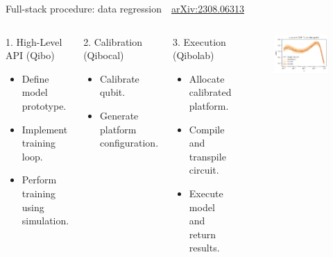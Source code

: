 \documentclass[aspectratio=169, 8pt, xcolor={svgnames}, hyperref={linkcolor=black}]{beamer}
\begin{document}
\begin{frame}{Full-stack procedure: data regression \hfill \faBook\,\, \href{https://arxiv.org/abs/2308.06313}{arXiv:2308.06313}}

   \begin{columns}
     \column{6cm}
     \begin{block}{1. High-Level API (Qibo)}
       \begin{itemize}
         \item Define model prototype.
         \item Implement training loop.
         \item Perform training using simulation.
       \end{itemize}
     \end{block}
     \begin{exampleblock}{2. Calibration (Qibocal)}
     \begin{itemize}
       \item Calibrate qubit.
       \item Generate platform configuration.
     \end{itemize}
     \end{exampleblock}
     \begin{alertblock}{3. Execution (Qibolab)}
       \begin{itemize}
         \item Allocate calibrated platform.
         \item Compile and transpile circuit.
         \item Execute model and return results.
       \end{itemize}
     \end{alertblock}
     \column{6cm}
   \begin{figure}
     \includegraphics[width=\textwidth]{figures/qqpdf.pdf}

\end{figure}
\end{columns}
\end{frame}
\end{document}
